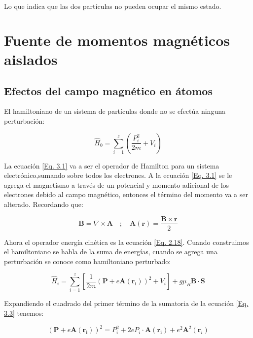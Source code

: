 \documentclass[11pt,fleqn]{book}
\renewcommand{\vec}[1]{\mathbf{#1}}
\begin{document}
Lo que indica que las dos partículas no pueden ocupar el mismo estado.


\chapter{Fuente de momentos magnéticos aislados}

\section{Efectos del campo magnético en átomos}

El hamiltoniano de un sistema de partículas donde no se efectúa ninguna perturbación:

\begin{equation}
    \hat{H}_{0}=\sum_{i=1}^{z}\left(\frac{P_{i}^{2}}{2m}+V_{i}\right)
    \label{Eq. 3.1}
\end{equation}

La ecuación \ref{Eq. 3.1} va a ser el operador de Hamilton para un sistema electrónico,sumando sobre todos los electrones. A la ecuación \ref{Eq. 3.1} se le agrega el magnetismo a través de un potencial y momento adicional de los electrones debido al campo magnético, entonces el término del momento va a ser alterado. Recordando que:

\begin{equation}
    \vec{B}=\nabla\times\vec{A}\quad;\quad\vec{A}(\vec{r})=\frac{\vec{B}\times\vec{r}}{2}
    \label{Eq. 3.2}
\end{equation}

Ahora el operador energía cinética es la ecuación \ref{Eq. 2.18}. Cuando construimos el hamiltoniano se habla de la suma de energías, cuando se agrega una perturbación se conoce como hamiltoniano perturbado:

\begin{equation}
    \hat{H}_{i}=\sum_{i=1}^{z}\left[\frac{1}{2m}\left(\vec{P}+e\vec{A(\vec{r}_{i})}\right)^{2}+V_{i}\right]+ g\mu_{B}\vec{B}\cdot\vec{S}
    \label{Eq. 3.3}
\end{equation}

Expandiendo el cuadrado del primer término de la sumatoria de la ecuación \ref{Eq. 3.3} tenemos:

\begin{equation}
    \left(\vec{P}+e\vec{A(\vec{r}_{i})}\right)^{2}=P_{i}^{2}+2eP_{i}\cdot\vec{A(\vec{r}_{i})}+e^{2}\vec{A}^{2}(\vec{r}_{i})
    \label{Eq. 3.4}
\end{equation}
\end{document}
